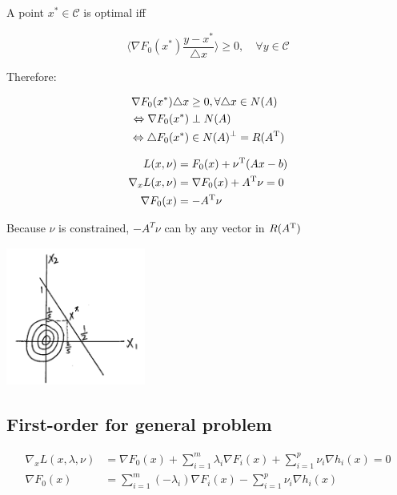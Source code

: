 A point $x^*\in\mathcal{C}$ is optimal iff 

\begin{equation*}
\langle\nabla F_0(x^*)\frac{y-x^*}{\triangle x}\rangle\geq 0,\quad \forall y\in\mathcal{C}
\end{equation*}

Therefore:

\begin{align*}
\nabla F_0(x^*)\triangle x &\geq 0, \forall \triangle x\in N(A)\\
\Leftrightarrow \nabla F_0(x^*) &\perp N(A)\\
\Leftrightarrow \triangle F_0(x^*) &\in N(A)^{\perp} = R(A^{{\rm T}})
\end{align*}

\begin{align*}
L(x,\nu) &= F_0(x) +\nu^{{\rm T}}(Ax-b)\\
\nabla_xL(x,\nu) &= \nabla F_0(x) + A^{{\rm T}}\nu  = 0\\
\nabla F_0(x) &= -A^{{\rm T}}\nu
\end{align*}


Because $\nu$ is constrained, $-A^{T}\nu$ can by any vector in $R(A^{{\rm T}})$

\begin{marginfigure}
	\centering
	\includegraphics[width=1.8in,height=1.8in]{figures/ch10/figure1204_4.png}
\end{marginfigure}



\subsection{First-order for general problem}

\begin{align*}
\nabla_x L(x,\lambda,\nu) &= \nabla F_0(x) + \sum^m_{i=1}\lambda_i\nabla F_i(x) + \sum^p_{i=1}\nu_i \nabla h_i(x) = 0\\
\nabla F_0(x) &= \sum^m_{i=1}(-\lambda_i)\nabla F_i(x) - \sum^p_{i=1}\nu_i\nabla h_i(x)\\
\end{align*}

